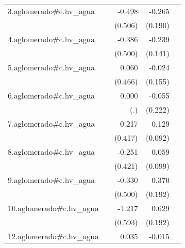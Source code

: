 {\begin{longtable}{l*{4}{D{.}{.}{-1}}}
\addlinespace
3.aglomerado#c.hv\_agua&                     &      -0.498         &      -0.265         &                     \\
            &                     &     (0.506)         &     (0.190)         &                     \\
\addlinespace
4.aglomerado#c.hv\_agua&                     &      -0.386         &      -0.239         &                     \\
            &                     &     (0.500)         &     (0.141)         &                     \\
\addlinespace
5.aglomerado#c.hv\_agua&                     &       0.060         &      -0.024         &                     \\
            &                     &     (0.466)         &     (0.155)         &                     \\
\addlinespace
6.aglomerado#c.hv\_agua&                     &       0.000         &      -0.055         &                     \\
            &                     &         (.)         &     (0.222)         &                     \\
\addlinespace
7.aglomerado#c.hv\_agua&                     &      -0.217         &       0.129         &                     \\
            &                     &     (0.417)         &     (0.092)         &                     \\
\addlinespace
8.aglomerado#c.hv\_agua&                     &      -0.251         &       0.059         &                     \\
            &                     &     (0.421)         &     (0.099)         &                     \\
\addlinespace
9.aglomerado#c.hv\_agua&                     &      -0.330         &       0.370         &                     \\
            &                     &     (0.500)         &     (0.192)         &                     \\
\addlinespace
10.aglomerado#c.hv\_agua&                     &      -1.217\sym{*}  &       0.629\sym{**} &                     \\
            &                     &     (0.593)         &     (0.192)         &                     \\
\addlinespace
12.aglomerado#c.hv\_agua&                     &       0.035         &      -0.015         &                     \\

\end{longtable}}
